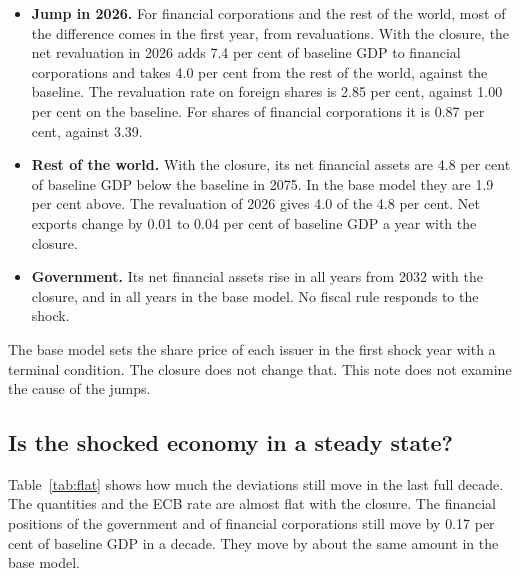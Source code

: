 \documentclass[11pt,a4paper]{article}
\begin{document}
\begin{itemize}
\item \textbf{Jump in 2026.} For financial corporations and the rest of the world, most of the difference comes in the first year, from revaluations. With the closure, the net revaluation in 2026 adds 7.4 per cent of baseline GDP to financial corporations and takes 4.0 per cent from the rest of the world, against the baseline. The revaluation rate on foreign shares is 2.85 per cent, against 1.00 per cent on the baseline. For shares of financial corporations it is 0.87 per cent, against 3.39.
\item \textbf{Rest of the world.} With the closure, its net financial assets are 4.8 per cent of baseline GDP below the baseline in 2075. In the base model they are 1.9 per cent above. The revaluation of 2026 gives 4.0 of the 4.8 per cent. Net exports change by 0.01 to 0.04 per cent of baseline GDP a year with the closure.
\item \textbf{Government.} Its net financial assets rise in all years from 2032 with the closure, and in all years in the base model. No fiscal rule responds to the shock.
\end{itemize}
The base model sets the share price of each issuer in the first shock year with a terminal condition. The closure does not change that. This note does not examine the cause of the jumps.

\FloatBarrier
\subsection{Is the shocked economy in a steady state?}

Table~\ref{tab:flat} shows how much the deviations still move in the last full decade.
The quantities and the ECB rate are almost flat with the closure. The financial positions of the government and of financial corporations still move by 0.17 per cent of baseline GDP in a decade. They move by about the same amount in the base model.
\end{document}
